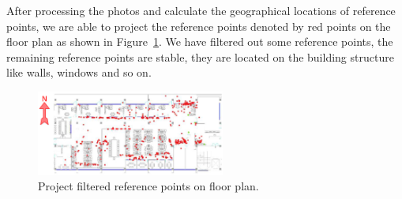 After processing the photos and calculate the geographical locations of reference points, we are able to project the reference points denoted by red points on the floor plan as shown in Figure~\ref{office_ref}. We have filtered out some reference points, the remaining reference points are stable, \ie they are located on the building structure like walls, windows and so on.
\begin{figure}[!htbp]
\centering
\includegraphics[width=1\linewidth, height=1.1in, clip,keepaspectratio]{officeref4.eps}
\caption{Project filtered reference points on floor plan.}\label{office_ref}
\end{figure}


